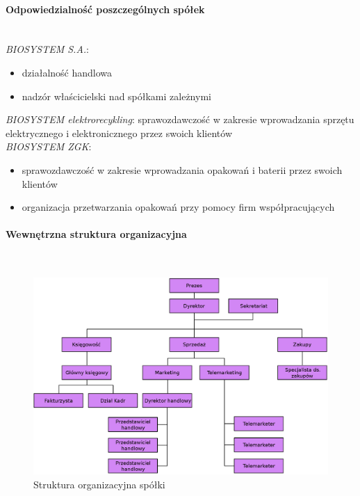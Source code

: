 \paragraph{Odpowiedzialność poszczególnych spółek} \ \\
\emph{BIOSYSTEM S.A.}: 
\begin{itemize}
	\item działalność handlowa
	\item nadzór właścicielski nad spółkami zależnymi
\end{itemize}
\emph{BIOSYSTEM elektrorecykling}: sprawozdawczość w zakresie wprowadzania sprzętu elektrycznego i elektronicznego przez swoich klientów \\
\emph{BIOSYSTEM ZGK}:
\begin{itemize}
	\item sprawozdawczość w zakresie wprowadzania opakowań i baterii przez swoich klientów
	\item organizacja przetwarzania opakowań przy pomocy firm współpracujących
\end{itemize}

\paragraph{Wewnętrzna struktura organizacyjna} \ \\

\begin{figure}[H]
    \centering
    \includegraphics[width=1\textwidth]{img/organization_chart.eps}
    \caption{Struktura organizacyjna spółki}
\end{figure}